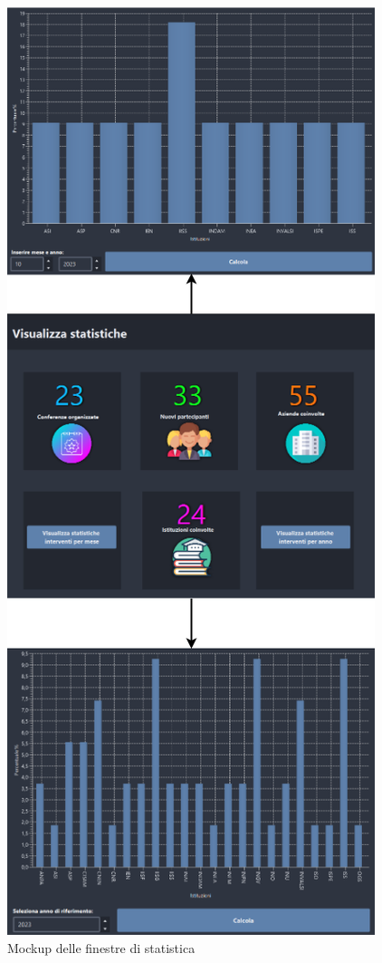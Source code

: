 \begin{figure}[h!]
	\centering
	\includegraphics[scale=0.5]{Immagini/Mockup/Stats/Flow_Stats.png}
	\caption{Mockup delle finestre di statistica}
\end{figure}

